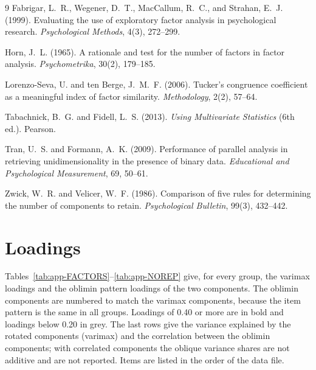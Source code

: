 \documentclass[11pt,a4paper]{article}
\begin{document}
\begin{thebibliography}{9}
Fabrigar, L.~R., Wegener, D.~T., MacCallum, R.~C., and Strahan, E.~J. (1999).
Evaluating the use of exploratory factor analysis in psychological research.
\emph{Psychological Methods}, 4(3), 272--299.

Horn, J.~L. (1965).
A rationale and test for the number of factors in factor analysis.
\emph{Psychometrika}, 30(2), 179--185.

Lorenzo-Seva, U. and ten Berge, J.~M.~F. (2006).
Tucker's congruence coefficient as a meaningful index of factor similarity.
\emph{Methodology}, 2(2), 57--64.

Tabachnick, B.~G. and Fidell, L.~S. (2013).
\emph{Using Multivariate Statistics} (6th ed.). Pearson.

Tran, U.~S. and Formann, A.~K. (2009).
Performance of parallel analysis in retrieving unidimensionality in the presence of binary data.
\emph{Educational and Psychological Measurement}, 69, 50--61.

Zwick, W.~R. and Velicer, W.~F. (1986).
Comparison of five rules for determining the number of components to retain.
\emph{Psychological Bulletin}, 99(3), 432--442.
\end{thebibliography}

\appendix

\section{Loadings}\label{app:load}

Tables~\ref{tab:app-FACTORS}--\ref{tab:app-NOREP} give, for every group, the varimax loadings and the oblimin pattern loadings of the two components. The oblimin components are numbered to match the varimax components, because the item pattern is the same in all groups. Loadings of 0.40 or more are in bold and loadings below 0.20 in grey. The last rows give the variance explained by the rotated components (varimax) and the correlation between the oblimin components; with correlated components the oblique variance shares are not additive and are not reported. Items are listed in the order of the data file.
\end{document}

